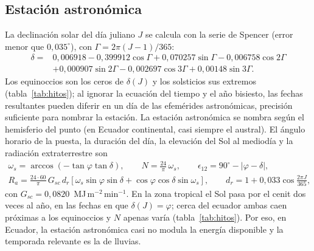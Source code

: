 \documentclass[11pt,a4paper]{article}
\begin{document}
\subsection{Estación astronómica}
La declinación solar del día juliano $J$ se calcula con la serie de Spencer \cite{spencer1971}
(error menor que $0{,}035^\circ$), con $\Gamma = 2\pi(J-1)/365$:
\begin{equation}
\begin{aligned}
  \delta = {}&0{,}006918 - 0{,}399912\cos\Gamma + 0{,}070257\sin\Gamma - 0{,}006758\cos2\Gamma\\
  &+ 0{,}000907\sin2\Gamma - 0{,}002697\cos3\Gamma + 0{,}00148\sin3\Gamma .
\end{aligned}
\end{equation}
Los equinoccios son los ceros de $\delta(J)$ y los solsticios sus extremos (tabla~\ref{tab:hitos}); al
ignorar la ecuación del tiempo y el año bisiesto, las fechas resultantes pueden diferir en un día de las
efemérides astronómicas, precisión suficiente para nombrar la estación. La
estación astronómica se nombra según el hemisferio del punto (en Ecuador continental, casi siempre el
austral). El ángulo horario de la puesta, la duración del día, la elevación del Sol al mediodía y la
radiación extraterrestre son \cite{allen1998}
\begin{gather}
  \omega_s = \arccos(-\tan\varphi\tan\delta),\qquad N = \frac{24}{\pi}\,\omega_s,\qquad
  \epsilon_{12} = 90^\circ - |\varphi-\delta|,\\
  R_a = \frac{24\cdot60}{\pi}\,G_{sc}\,d_r\left[\omega_s\sin\varphi\sin\delta + \cos\varphi\cos\delta\sin\omega_s\right],
  \qquad d_r = 1 + 0{,}033\cos\frac{2\pi J}{365},
\end{gather}
con $G_{sc} = 0{,}0820$~MJ\,m$^{-2}$\,min$^{-1}$. En la zona tropical el Sol pasa por el cenit dos veces al
año, en las fechas en que $\delta(J) = \varphi$; cerca del ecuador ambas caen próximas a los equinoccios y
$N$ apenas varía (tabla~\ref{tab:hitos}). Por eso, en Ecuador, la estación astronómica casi no modula la
energía disponible y la temporada relevante es la de lluvias.

\TablaHitos
\end{document}
